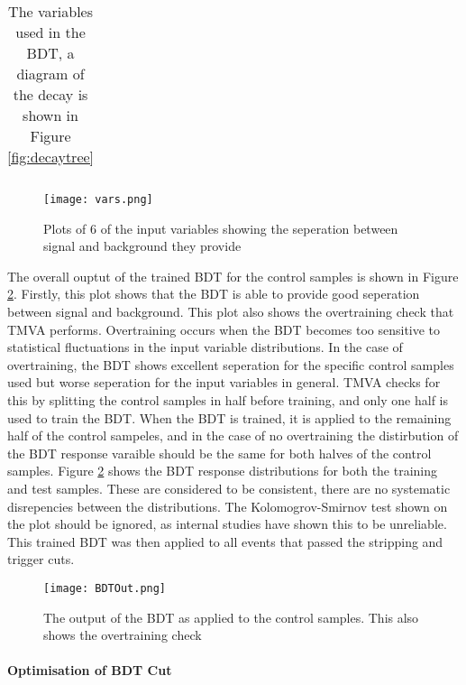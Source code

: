 \begin{table}[h]
\begin{tabular}{|c|p{10cm}|}
  \end{tabular}
  \caption{The variables used in the BDT, a diagram of the decay is shown in Figure \ref{fig:decaytree}}
\end{table}

\begin{figure}
  \centering
  \texttt{[image: vars.png]}
  \caption{Plots of 6 of the input variables showing the seperation between signal and background they provide}
  \label{fig:vars}
\end{figure}

The overall ouptut of the trained BDT for the control samples is shown in Figure \ref{fig:BDTOut}.  Firstly, this plot shows that the BDT is able to provide good seperation between signal and background.  This plot also shows the overtraining check that TMVA performs.  Overtraining occurs when the BDT becomes too sensitive to statistical fluctuations in the input variable distributions.  In the case of overtraining, the BDT shows excellent seperation for the specific control samples used but worse seperation for the input variables in general.  TMVA checks for this by splitting the control samples in half before training, and only one half is used to train the BDT.  When the BDT is trained, it is applied to the remaining half of the control sampeles, and in the case of no overtraining the distirbution of the BDT response varaible should be the same for both halves of the control samples.  Figure \ref{fig:BDTOut} shows the BDT response distributions for both the training and test samples. These are considered to be consistent, there are no systematic disrepencies between the distributions.  The Kolomogrov-Smirnov test shown on the plot should be ignored, as internal \lhcb studies have shown this to be unreliable\cite{Grünberg:2019861}.  This trained BDT was then applied to all events that passed the stripping and trigger cuts.

\begin{figure}
  \centering
  \texttt{[image: BDTOut.png]}
  \caption{The output of the BDT as applied to the control samples.  This also shows the overtraining check}
  \label{fig:BDTOut}
\end{figure}

\paragraph{Optimisation of BDT Cut}




\clearpage
